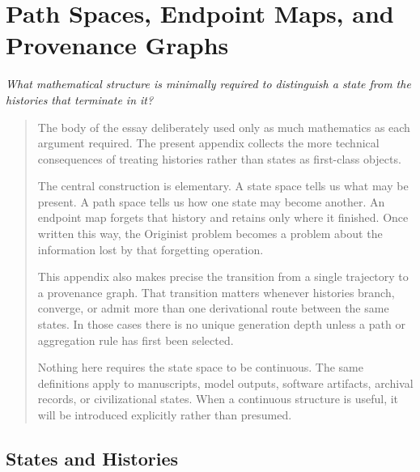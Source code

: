 \documentclass[
  11pt,
  a4paper,
  DIV=12,
  BCOR=0mm,
  parskip=half-
]{scrartcl}
\theoremstyle{definition}
\theoremstyle{plain}
\theoremstyle{remark}
\newcommand{\movementquestion}[1]{%
  \begin{center}
    \small\itshape
    #1
  \end{center}
  \medskip
}
\newenvironment{orientation}
  {%
    \begin{quote}
    \small
    \setlength{\parindent}{1em}
  }
  {%
    \end{quote}
  }
\begin{document}

\clearpage
\appendix

\section{Path Spaces, Endpoint Maps, and Provenance Graphs}
\label{app:path-spaces}

\movementquestion{What mathematical structure is minimally required to distinguish a state from the histories that terminate in it?}

\begin{orientation}
The body of the essay deliberately used only as much mathematics as each
argument required. The present appendix collects the more technical
consequences of treating histories rather than states as first-class objects.

The central construction is elementary. A state space tells us what may be
present. A path space tells us how one state may become another. An endpoint
map forgets that history and retains only where it finished. Once written this
way, the Originist problem becomes a problem about the information lost by
that forgetting operation.

This appendix also makes precise the transition from a single trajectory to a
provenance graph. That transition matters whenever histories branch, converge,
or admit more than one derivational route between the same states. In those
cases there is no unique generation depth unless a path or aggregation rule
has first been selected.

Nothing here requires the state space to be continuous. The same definitions
apply to manuscripts, model outputs, software artifacts, archival records, or
civilizational states. When a continuous structure is useful, it will be
introduced explicitly rather than presumed.
\end{orientation}


\subsection{States and Histories}
\label{app:states-histories}
\end{document}

